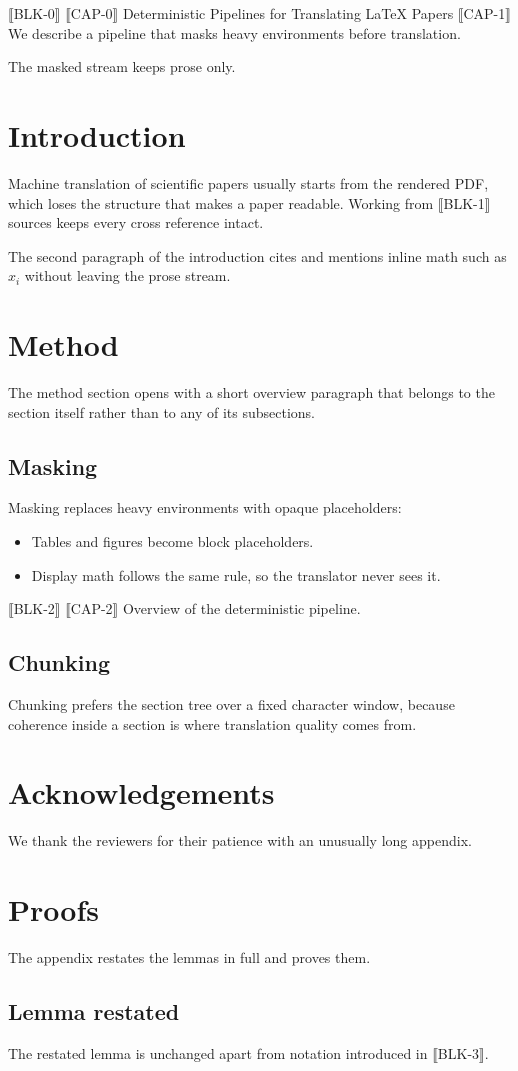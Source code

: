 ⟦BLK-0⟧
⟦CAP-0⟧ Deterministic Pipelines for Translating \LaTeX{} Papers
⟦CAP-1⟧ We describe a pipeline that masks heavy environments before translation. \par The masked stream keeps prose only.

\section{Introduction}
\label{sec:intro}
Machine translation of scientific papers usually starts from the rendered PDF, which
loses the structure that makes a paper readable. Working from ⟦BLK-1⟧ sources keeps
every cross reference intact.

The second paragraph of the introduction cites \cite{knuth1984} and mentions inline
math such as $x_i$ without leaving the prose stream.

\section{Method}
The method section opens with a short overview paragraph that belongs to the section
itself rather than to any of its subsections.

\subsection{Masking}
Masking replaces heavy environments with opaque placeholders:

\begin{itemize}
  \item Tables and figures become block placeholders.

  \item Display math follows the same rule, so the translator never sees it.
\end{itemize}

⟦BLK-2⟧
⟦CAP-2⟧ Overview of the deterministic pipeline.

\subsection{Chunking}
Chunking prefers the section tree over a fixed character window, because coherence
inside a section is where translation quality comes from.

\section*{Acknowledgements}
We thank the reviewers for their patience with an unusually long appendix.

\appendix

\section{Proofs}
\label{app:proofs}
The appendix restates the lemmas in full and proves them.

\subsection{Lemma restated}
The restated lemma is unchanged apart from notation introduced in ⟦BLK-3⟧.
